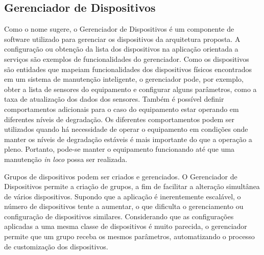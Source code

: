 %


\subsection{Gerenciador de Dispositivos}
\label{sub:proposta-gerenciador-dispositivos}

Como o nome sugere, o Gerenciador de Dispositivos é um componente de software utilizado para
gerenciar os dispositivos da arquitetura proposta. A configuração ou obtenção da lista dos
dispositivos na aplicação orientada a serviços são exemplos de funcionalidades do gerenciador. Como
os dispositivos são entidades que mapeiam funcionalidades dos dispositivos físicos encontrados em um
sistema de manutenção inteligente, o gerenciador pode, por exemplo, obter a lista de sensores do
equipamento e configurar alguns parâmetros, como a taxa de atualização dos dados dos sensores.
Também é possível definir comportamentos adicionais para o caso do equipamento estar operando em
diferentes níveis de degradação. Os diferentes comportamentos podem ser utilizados quando há
necessidade de operar o equipamento em condições onde manter os níveis de degradação estáveis é mais
importante do que a operação a pleno. Portanto, pode-se manter o equipamento funcionando até que uma
manutenção \textit{in loco} possa ser realizada.

Grupos de dispositivos podem ser criados e gerenciados. O Gerenciador de Dispositivos permite a
criação de grupos, a fim de facilitar a alteração simultânea de vários dispositivos. Supondo que a
aplicação é inerentemente escalável, o número de dispositivos tente a aumentar, o que dificulta o
gerenciamento ou configuração de dispositivos similares. Considerando que as configurações aplicadas
a uma mesma classe de dispositivos é muito parecida, o gerenciador permite que um grupo receba os
mesmos parâmetros, automatizando o processo de customização dos dispositivos.

